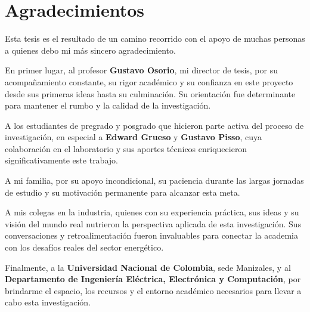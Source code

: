 ﻿\chapter*{\sffamily Agradecimientos}
%

Esta tesis es el resultado de un camino recorrido con el apoyo de muchas personas a quienes debo mi más sincero agradecimiento.

En primer lugar, al profesor \textbf{Gustavo Osorio}, mi director de tesis, por su acompañamiento constante, su rigor académico y su confianza en este proyecto desde sus primeras ideas hasta su culminación. Su orientación fue determinante para mantener el rumbo y la calidad de la investigación.

A los estudiantes de pregrado y posgrado que hicieron parte activa del proceso de investigación, en especial a \textbf{Edward Grueso} y \textbf{Gustavo Pisso}, cuya colaboración en el laboratorio y sus aportes técnicos enriquecieron significativamente este trabajo.

A mi familia, por su apoyo incondicional, su paciencia durante las largas jornadas de estudio y su motivación permanente para alcanzar esta meta.

A mis colegas en la industria, quienes con su experiencia práctica, sus ideas y su visión del mundo real nutrieron la perspectiva aplicada de esta investigación. Sus conversaciones y retroalimentación fueron invaluables para conectar la academia con los desafíos reales del sector energético.

Finalmente, a la \textbf{Universidad Nacional de Colombia}, sede Manizales, y al \textbf{Departamento de Ingeniería Eléctrica, Electrónica y Computación}, por brindarme el espacio, los recursos y el entorno académico necesarios para llevar a cabo esta investigación.

